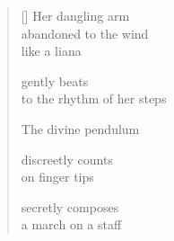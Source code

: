 \documentclass[11pt,a4paper]{article}
\begin{document}
\thispagestyle{empty}

\poemtitle{}

\settowidth{\versewidth}{up to the fluttering measure}

\bigskip

\begin{verse}[\versewidth]
  Her dangling arm \\
  abandoned to the wind \\
  like a liana

  gently beats \\
  to the rhythm of her steps

  The divine pendulum

  discreetly counts \\
  on finger tips

  secretly composes \\
  a march on a staff
  \end{verse}
\end{document}
